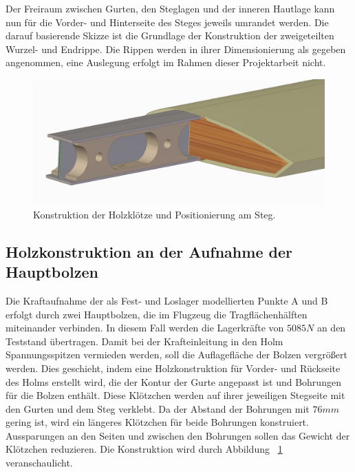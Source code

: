 \noindent Der Freiraum zwischen Gurten, den Steglagen und der inneren Hautlage kann nun für die Vorder- und Hinterseite des Steges jeweils umrandet werden. Die darauf basierende Skizze ist die Grundlage der Konstruktion der zweigeteilten Wurzel- und Endrippe. Die Rippen werden in ihrer Dimensionierung als gegeben angenommen, eine Auslegung erfolgt im Rahmen dieser Projektarbeit nicht.\\

\begin{figure}
	\includegraphics[width=1.0\textwidth]{Bilder/Klotz.jpg}
	\caption{Konstruktion der Holzklötze und Positionierung am Steg.}
	\label{fig: Klotz}
\end{figure}
\subsection{Holzkonstruktion an der Aufnahme der Hauptbolzen}
Die Kraftaufnahme der  als Fest- und Loslager modellierten Punkte A und B erfolgt durch zwei Hauptbolzen, die im Flugzeug die Tragflächenhälften miteinander verbinden. In diesem Fall werden die Lagerkräfte von $ 5085N $ an den Teststand übertragen. Damit bei der Krafteinleitung in den Holm Spannungsspitzen vermieden werden, soll die Auflagefläche der Bolzen vergrößert werden. Dies geschieht, indem eine Holzkonstruktion für Vorder- und Rückseite des Holms erstellt wird, die der Kontur der Gurte angepasst ist und Bohrungen für die Bolzen enthält. Diese Klötzchen werden auf ihrer jeweiligen Stegseite mit den Gurten und dem Steg verklebt. Da der Abstand der Bohrungen mit $ 76mm $ gering ist, wird ein längeres Klötzchen für beide Bohrungen konstruiert. Aussparungen an den Seiten und zwischen den Bohrungen sollen das Gewicht der Klötzchen reduzieren. Die Konstruktion wird durch Abbildung ~\ref{fig: Klotz} veranschaulicht.   

